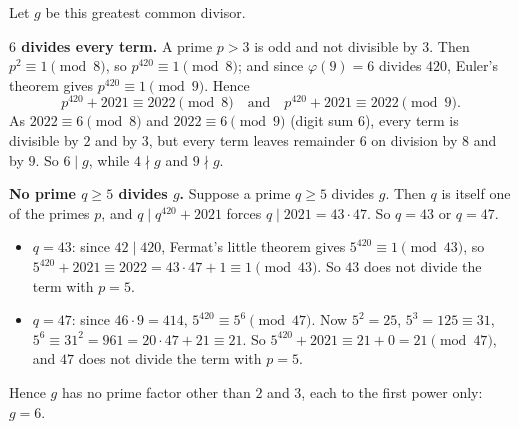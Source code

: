 Let $g$ be this greatest common divisor.

\textbf{$6$ divides every term.} A prime $p>3$ is odd and not divisible by $3$. Then $p^2\equiv1\pmod 8$, so $p^{420}\equiv1\pmod8$; and since $\varphi(9)=6$ divides $420$, Euler's theorem gives $p^{420}\equiv1\pmod 9$. Hence
\[p^{420}+2021\equiv2022\pmod 8\quad\text{and}\quad p^{420}+2021\equiv2022\pmod 9.\]
As $2022\equiv6\pmod8$ and $2022\equiv6\pmod9$ (digit sum $6$), every term is divisible by $2$ and by $3$, but every term leaves remainder $6$ on division by $8$ and by $9$. So $6\mid g$, while $4\nmid g$ and $9\nmid g$.

\textbf{No prime $q\ge5$ divides $g$.} Suppose a prime $q\ge5$ divides $g$. Then $q$ is itself one of the primes $p$, and $q\mid q^{420}+2021$ forces $q\mid2021=43\cdot47$. So $q=43$ or $q=47$.
\begin{itemize}
\item $q=43$: since $42\mid420$, Fermat's little theorem gives $5^{420}\equiv1\pmod{43}$, so $5^{420}+2021\equiv2022=43\cdot47+1\equiv1\pmod{43}$. So $43$ does not divide the term with $p=5$.
\item $q=47$: since $46\cdot9=414$, $5^{420}\equiv5^6\pmod{47}$. Now $5^2=25$, $5^3=125\equiv31$, $5^6\equiv31^2=961=20\cdot47+21\equiv21$. So $5^{420}+2021\equiv21+0=21\pmod{47}$, and $47$ does not divide the term with $p=5$.
\end{itemize}
Hence $g$ has no prime factor other than $2$ and $3$, each to the first power only: $g=\boxed{6}$.
